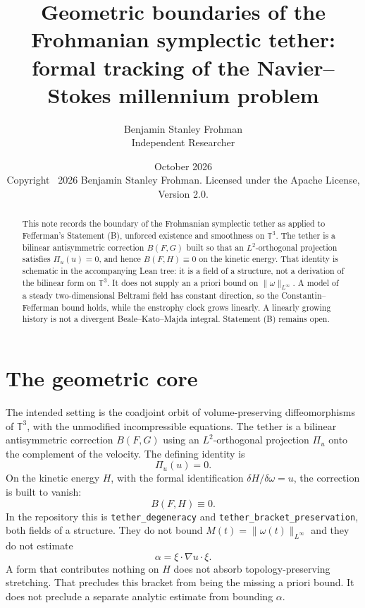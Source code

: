 \documentclass[11pt,a4paper]{article}
\begin{document}
\title{Geometric boundaries of the Frohmanian symplectic tether:\\
formal tracking of the Navier--Stokes millennium problem}
\author{Benjamin Stanley Frohman\\ Independent Researcher}
\date{October 2026\\
Copyright \textcopyright\ 2026 Benjamin Stanley Frohman.
Licensed under the Apache License, Version 2.0.}
\maketitle
\begin{abstract}
This note records the boundary of the Frohmanian symplectic tether as applied to Fefferman's Statement (B), unforced existence and smoothness on $\mathbb{T}^3$. The tether is a bilinear antisymmetric correction $B(F,G)$ built so that an $L^2$-orthogonal projection satisfies $\Pi_u(u)=0$, and hence $B(F,H)\equiv 0$ on the kinetic energy. That identity is schematic in the accompanying Lean tree: it is a field of a structure, not a derivation of the bilinear form on $\mathbb{T}^3$. It does not supply an a priori bound on $\|\omega\|_{L^\infty}$. A model of a steady two-dimensional Beltrami field has constant direction, so the Constantin--Fefferman bound holds, while the enstrophy clock grows linearly. A linearly growing history is not a divergent Beale--Kato--Majda integral. Statement (B) remains open.
\end{abstract}

\section{The geometric core}
The intended setting is the coadjoint orbit of volume-preserving diffeomorphisms of $\mathbb{T}^3$, with the unmodified incompressible equations. The tether is a bilinear antisymmetric correction $B(F,G)$ using an $L^2$-orthogonal projection $\Pi_u$ onto the complement of the velocity. The defining identity is
\[
\Pi_u(u)=0.
\]
On the kinetic energy $H$, with the formal identification $\delta H/\delta\omega=u$, the correction is built to vanish:
\[
B(F,H)\equiv 0.
\]
In the repository this is \texttt{tether\_degeneracy} and \texttt{tether\_bracket\_preservation}, both fields of a structure. They do not bound $M(t)=\|\omega(t)\|_{L^\infty}$ and they do not estimate
\[
\alpha=\xi\cdot\nabla u\cdot\xi.
\]
A form that contributes nothing on $H$ does not absorb topology-preserving stretching. That precludes this bracket from being the missing a priori bound. It does not preclude a separate analytic estimate from bounding $\alpha$.
\end{document}
